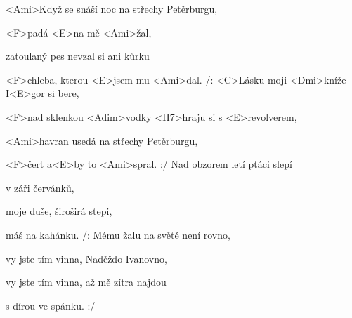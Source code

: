 

\zs
<Ami>Když se snáší noc na střechy Petěrburgu,

<F>padá <E>na mě <Ami>žal,

zatoulaný pes nevzal si ani kůrku

<F>chleba, kterou <E>jsem mu <Ami>dal.
\ks
\zr
/: <C>Lásku moji <Dmi>kníže I<E>gor si bere,


<F>nad sklenkou <Adim>vodky <H7>hraju si s <E>revolverem,

<Ami>havran usedá na střechy Petěrburgu,

<F>čert a<E>by to <Ami>spral. :/
\kr
\zs
Nad obzorem letí ptáci slepí

v záři červánků,

moje duše, široširá stepi,

máš na kahánku.
\ks
\zr
/: Mému žalu na světě není rovno,

vy jste tím vinna, Naděždo Ivanovno,

vy jste tím vinna, až mě zítra najdou

s dírou ve spánku. :/
\kr
\kp
